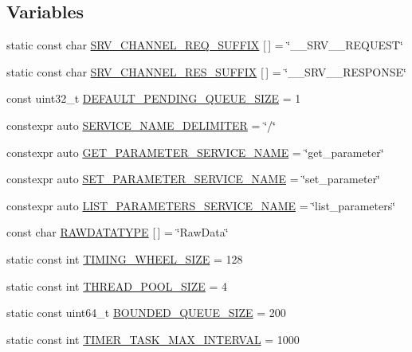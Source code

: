 \subsection*{Variables}
\begin{DoxyCompactItemize}
\item 
static const char \hyperlink{namespaceapollo_1_1cyber_a4d62d47d6a96a1b97cdbf40474b4b803}{S\-R\-V\-\_\-\-C\-H\-A\-N\-N\-E\-L\-\_\-\-R\-E\-Q\-\_\-\-S\-U\-F\-F\-I\-X} \mbox{[}$\,$\mbox{]} = \char`\"{}\-\_\-\-\_\-\-S\-R\-V\-\_\-\-\_\-\-R\-E\-Q\-U\-E\-S\-T\char`\"{}
\item 
static const char \hyperlink{namespaceapollo_1_1cyber_a9bd27ab5d5117d02d3517f948d3f3bd6}{S\-R\-V\-\_\-\-C\-H\-A\-N\-N\-E\-L\-\_\-\-R\-E\-S\-\_\-\-S\-U\-F\-F\-I\-X} \mbox{[}$\,$\mbox{]} = \char`\"{}\-\_\-\-\_\-\-S\-R\-V\-\_\-\-\_\-\-R\-E\-S\-P\-O\-N\-S\-E\char`\"{}
\item 
const uint32\-\_\-t \hyperlink{namespaceapollo_1_1cyber_a2f6db02a0b926d2d76f73ce52c149047}{D\-E\-F\-A\-U\-L\-T\-\_\-\-P\-E\-N\-D\-I\-N\-G\-\_\-\-Q\-U\-E\-U\-E\-\_\-\-S\-I\-Z\-E} = 1
\item 
constexpr auto \hyperlink{namespaceapollo_1_1cyber_ac60114c8d1710786f69ebfe7476c8301}{S\-E\-R\-V\-I\-C\-E\-\_\-\-N\-A\-M\-E\-\_\-\-D\-E\-L\-I\-M\-I\-T\-E\-R} = \char`\"{}/\char`\"{}
\item 
constexpr auto \hyperlink{namespaceapollo_1_1cyber_ace04c8ebc8ddf817366f405ae1a13bda}{G\-E\-T\-\_\-\-P\-A\-R\-A\-M\-E\-T\-E\-R\-\_\-\-S\-E\-R\-V\-I\-C\-E\-\_\-\-N\-A\-M\-E} = \char`\"{}get\-\_\-parameter\char`\"{}
\item 
constexpr auto \hyperlink{namespaceapollo_1_1cyber_a1a154dcfdc43e734bdbab4902dce0f79}{S\-E\-T\-\_\-\-P\-A\-R\-A\-M\-E\-T\-E\-R\-\_\-\-S\-E\-R\-V\-I\-C\-E\-\_\-\-N\-A\-M\-E} = \char`\"{}set\-\_\-parameter\char`\"{}
\item 
constexpr auto \hyperlink{namespaceapollo_1_1cyber_a95d12777ea6376b41c3bcdede2b70ccb}{L\-I\-S\-T\-\_\-\-P\-A\-R\-A\-M\-E\-T\-E\-R\-S\-\_\-\-S\-E\-R\-V\-I\-C\-E\-\_\-\-N\-A\-M\-E} = \char`\"{}list\-\_\-parameters\char`\"{}
\item 
const char \hyperlink{namespaceapollo_1_1cyber_a40285728c313913e8e422b7ae7794b5b}{R\-A\-W\-D\-A\-T\-A\-T\-Y\-P\-E} \mbox{[}$\,$\mbox{]} = \char`\"{}Raw\-Data\char`\"{}
\item 
static const int \hyperlink{namespaceapollo_1_1cyber_a708c544333efd71eb0b9439a18a297bf}{T\-I\-M\-I\-N\-G\-\_\-\-W\-H\-E\-E\-L\-\_\-\-S\-I\-Z\-E} = 128
\item 
static const int \hyperlink{namespaceapollo_1_1cyber_ad6cbdbe25bd25a9005ce37c68695d66b}{T\-H\-R\-E\-A\-D\-\_\-\-P\-O\-O\-L\-\_\-\-S\-I\-Z\-E} = 4
\item 
static const uint64\-\_\-t \hyperlink{namespaceapollo_1_1cyber_af9dadef03cf6b3a72c8785ea2d6e8e26}{B\-O\-U\-N\-D\-E\-D\-\_\-\-Q\-U\-E\-U\-E\-\_\-\-S\-I\-Z\-E} = 200
\item 
static const int \hyperlink{namespaceapollo_1_1cyber_a1765f3b8476f639edbcbbe53ff9e6c47}{T\-I\-M\-E\-R\-\_\-\-T\-A\-S\-K\-\_\-\-M\-A\-X\-\_\-\-I\-N\-T\-E\-R\-V\-A\-L} = 1000
\end{DoxyCompactItemize}



